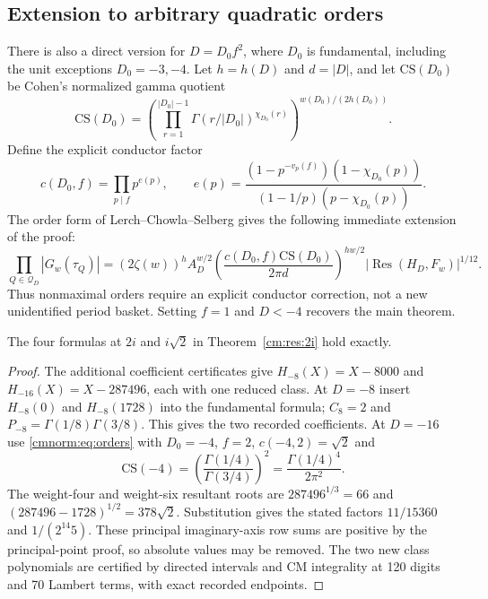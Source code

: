 \subsection{Extension to arbitrary quadratic orders}

There is also a direct version for $D=D_0f^2$, where $D_0$ is fundamental,
including the unit exceptions $D_0=-3,-4$. Let $h=h(D)$ and
$d=|D|$, and let $\mathrm{CS}(D_0)$ be Cohen's normalized gamma
quotient
\[
 \mathrm{CS}(D_0)=
 \left(\prod_{r=1}^{|D_0|-1}\Gamma(r/|D_0|)^{\chi_{D_0}(r)}
 \right)^{w(D_0)/(2h(D_0))}.
\]
Define the explicit conductor factor
\[
 c(D_0,f)=\prod_{p\mid f}p^{e(p)},\qquad
 e(p)=\frac{(1-p^{-v_p(f)})(1-\chi_{D_0}(p))}
 {(1-1/p)(p-\chi_{D_0}(p))}.
\]
The order form of Lerch--Chowla--Selberg\cite{cmnorm:Barquero,cmnorm:Cohen2026}
gives the following immediate extension of the proof:
\begin{equation}
 \prod_{Q\in\mathcal Q_D}|G_w(\tau_Q)|
 =(2\zeta(w))^h A_D^{w/2}
 \left(\frac{c(D_0,f)\mathrm{CS}(D_0)}{2\pi d}\right)^{hw/2}
 |\operatorname{Res}(H_D,F_w)|^{1/12}.
 \label{cmnorm:eq:orders}
\end{equation}
Thus nonmaximal orders require an explicit conductor correction, not a
new unidentified period basket. Setting $f=1$ and $D<-4$ recovers the
main theorem.

\begin{corollary}
\label{cmnorm:cor:classone}
The four formulas at $2i$ and $i\sqrt2$ in
Theorem~\ref{cm:res:2i} hold exactly.
\end{corollary}
\begin{proof}
The additional coefficient certificates give
$H_{-8}(X)=X-8000$ and $H_{-16}(X)=X-287496$, each with one reduced
class. At $D=-8$ insert $H_{-8}(0)$ and $H_{-8}(1728)$ into the
fundamental formula; $C_8=2$ and
$P_{-8}=\Gamma(1/8)\Gamma(3/8)$. This gives the two recorded coefficients.
At $D=-16$ use \eqref{cmnorm:eq:orders} with $D_0=-4$, $f=2$,
$c(-4,2)=\sqrt2$ and
\[
 \mathrm{CS}(-4)=\left(\frac{\Gamma(1/4)}{\Gamma(3/4)}\right)^2
              =\frac{\Gamma(1/4)^4}{2\pi^2}.
\]
The weight-four and weight-six resultant roots are
$287496^{1/3}=66$ and
$(287496-1728)^{1/2}=378\sqrt2$. Substitution gives the stated factors
$11/15360$ and $1/(2^{14}5)$. These principal imaginary-axis row sums
are positive by the principal-point proof, so absolute values may be removed.
The two new class polynomials are certified by directed intervals and CM
integrality at 120 digits and 70 Lambert terms, with exact recorded endpoints.
\end{proof}

